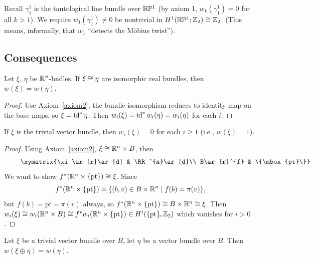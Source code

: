\begin{axiom}\label{axiom4}
Recall $\gamma^{1}_{1}$ is the tautological line bundle over $\mathbb{R}\mathbb{P}^{1}$
(by axiom 1, $w_{k}(\gamma^{1}_{1})=0$ for all $k>1$). We require
$w_{1}(\gamma^{1}_{1})\neq0$ be nontrivial in $H^{1}(\mathbb{R}\mathbb{P}^{1};\mathbb{Z}_{2})\cong\mathbb{Z}_{2}$.
(This means, informally, that $w_{1}$ ``detects the M\"{o}bius twist'').
\end{axiom}

\subsection{Consequences}

\begin{proposition}
Let $\xi$, $\eta$ be $\mathbb{R}^{n}$-bndles. If $\xi\cong\eta$ are isomorphic
real bundles, then $w(\xi)=w(\eta)$.
\end{proposition}

\begin{proof}
Use Axiom~\ref{axiom2}, the bundle isomorphism reduces to identity map
on the base maps, so $\xi=\operatorname{id}^{*}\eta$. Then
$w_{i}(\xi)=\operatorname{id}^{*}w_{i}(\eta)=w_{i}(\eta)$ for each $i$.
\end{proof}

\begin{proposition}
If $\xi$ is the trivial vector bundle, then $w_{i}(\xi)=0$ for each
$i\geq1$ (i.e., $w(\xi)=1$).
\end{proposition}

\begin{proof}
Using Axiom~\ref{axiom2}, $\xi\cong\mathbb{R}^{n}\times B$, then
\begin{equation}
\vcenter{\xymatrix{\xi\ar[r]\ar[d] & \RR^{n}\ar[d]\\
B\ar[r]^{f} & \{\mbox{pt}\}}}
\end{equation}
We want to show $f^{*}(\mathbb{R}^{n}\times\{\mbox{pt}\})\cong\xi$. Since
\begin{equation}
f^{*}(\mathbb{R}^{n}\times\{\mbox{pt}\})=\{(b,v)\in B\times\mathbb{R}^{n}\mid f(b)=\pi(v)\},
\end{equation}
but $f(b)=\mbox{pt}=\pi(v)$ always, so
$f^{*}(\mathbb{R}^{n}\times\{\mbox{pt}\})\cong B\times\mathbb{R}^{n}\cong\xi$. Then
$w_{i}(\xi)\cong w_{i}(\mathbb{R}^{n}\times B)\cong f^{*}w_{i}(\mathbb{R}^{n}\times\{\mbox{pt}\})\in H^{i}(\{\mbox{pt}\},\mathbb{Z}_{2})$
which vanishes for $i>0$.
\end{proof}

\begin{proposition}
Let $\xi$ be a trivial vector bundle over $B$, let $\eta$ be a vector
bundle over $B$. Then $w(\xi\oplus\eta)=w(\eta)$.
\end{proposition}

